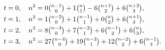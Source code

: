 \begin{align*}
  t=0, \quad
  n^3
  &= 0 \tbinom{n-1}{0} + 1 \tbinom{n}{1} - 6 \tbinom{n+1}{2} + 6 \tbinom{n+2}{3}, \\
  t=1, \quad
  n^3
  &= 1 \tbinom{n-2}{0} + 1 \tbinom{n-1}{1} + 0 \tbinom{n}{2} + 6 \tbinom{n+1}{3}, \\
  t=2, \quad
  n^3
  &= 8 \tbinom{n-3}{0} + 7 \tbinom{n-2}{1} + 6 \tbinom{n-1}{2} + 6 \tbinom{n}{3}, \\
  t=3, \quad
  n^3
  &= 27 \tbinom{n-4}{0} + 19 \tbinom{n-3}{1} + 12 \tbinom{n-2}{2} + 6 \tbinom{n-1}{3}.
\end{align*}
